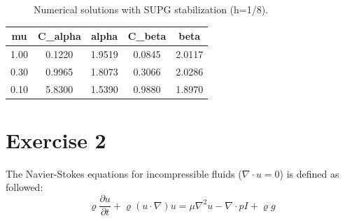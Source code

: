 \documentclass{article}
\begin{document}
\begin{figure}
\centering
  \hfill
  \caption{Numerical solutions with SUPG stabilization (h=1/8).}
\end{figure}

\begin{center}
 \begin{tabular}{||c c c c c||}
 \hline
mu & C_{alpha} & alpha & C_{beta} & beta \\ [0.5ex]
\hline\hline
1.00 & 0.1220 & 1.9519 & 0.0845 & 2.0117 \\
\hline
0.30 & 0.9965 & 1.8073 & 0.3066 & 2.0286 \\
\hline
0.10 & 5.8300 & 1.5390 & 0.9880 & 1.8970 \\
\hline
\end{tabular}
\end{center}




\section*{Exercise 2}
The Navier-Stokes equations for incompressible fluids ($\nabla \cdot u = 0$) is defined as followed:
\begin{equation}
  \varrho \frac{ \partial  u}{\partial t} +  \varrho (u \cdot \nabla) u = \mu \nabla^2 u -\nabla \cdot pI + \varrho g
\end{equation}
\end{document}
